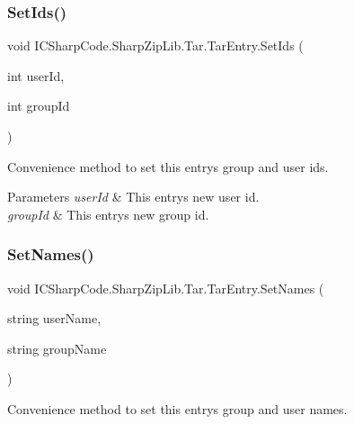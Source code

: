 \subsubsection{\texorpdfstring{Set\+Ids()}{SetIds()}}
{\footnotesize\ttfamily void I\+C\+Sharp\+Code.\+Sharp\+Zip\+Lib.\+Tar.\+Tar\+Entry.\+Set\+Ids (\begin{DoxyParamCaption}\item[{int}]{user\+Id,  }\item[{int}]{group\+Id }\end{DoxyParamCaption})\hspace{0.3cm}{\ttfamily [inline]}}



Convenience method to set this entry\textquotesingle{}s group and user ids. 


\begin{DoxyParams}{Parameters}
{\em user\+Id} & This entry\textquotesingle{}s new user id. \\
\hline
{\em group\+Id} & This entry\textquotesingle{}s new group id. \\
\hline
\end{DoxyParams}
\mbox{\label{class_i_c_sharp_code_1_1_sharp_zip_lib_1_1_tar_1_1_tar_entry_a374c8399fc9caed499f93e7369132012}} 
\subsubsection{\texorpdfstring{Set\+Names()}{SetNames()}}
{\footnotesize\ttfamily void I\+C\+Sharp\+Code.\+Sharp\+Zip\+Lib.\+Tar.\+Tar\+Entry.\+Set\+Names (\begin{DoxyParamCaption}\item[{string}]{user\+Name,  }\item[{string}]{group\+Name }\end{DoxyParamCaption})\hspace{0.3cm}{\ttfamily [inline]}}



Convenience method to set this entry\textquotesingle{}s group and user names. 


